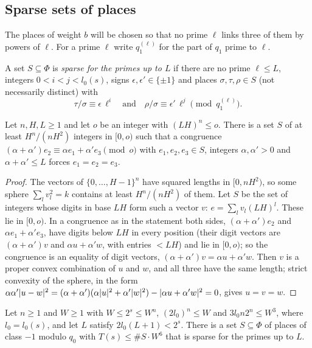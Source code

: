 \subsection{Sparse sets of places}\label{ss:sparse}
The places of weight $b$ will be chosen so that no prime $\ell$ links three of them by powers of
$\ell$. For a prime $\ell$ write $q_1^{(\ell)}$ for the part of $q_1$ prime to $\ell$.

\begin{definition}\label{def:sparse}
A set $S\subseteq\Phi$ is \emph{sparse for the primes up to $L$} if there are no prime $\ell\le L$,
integers $0<i<j<l_0(s)$, signs $\epsilon,\epsilon'\in\{\pm1\}$ and places $\sigma,\tau,\rho\in S$
(not necessarily distinct) with
\[
  \tau/\sigma\equiv\epsilon\,\ell^i\quad\text{and}\quad\rho/\sigma\equiv\epsilon'\,\ell^j
  \pmod{q_1^{(\ell)}}.
\]
\end{definition}

\begin{lemma}\label{lem:behrend}
Let $n,H,L\ge1$ and let $o$ be an integer with $(LH)^n\le o$. There is a set $S$ of at least
$H^n/(nH^2)$ integers in $[0,o)$ such that a congruence
$(\alpha+\alpha')e_2\equiv\alpha e_1+\alpha'e_3\pmod o$ with $e_1,e_2,e_3\in S$, integers
$\alpha,\alpha'>0$ and $\alpha+\alpha'\le L$ forces $e_1=e_2=e_3$.
\end{lemma}

\begin{proof}
The vectors of $\{0,\dots,H-1\}^n$ have squared lengths in $[0,nH^2)$, so some sphere
$\sum_lv_l^2=k$ contains at least $H^n/(nH^2)$ of them. Let $S$ be the set of integers whose digits in
base $LH$ form such a vector $v$: $e=\sum_lv_l(LH)^l$. These lie in $[0,o)$. In a congruence as in the
statement both sides, $(\alpha+\alpha')e_2$ and $\alpha e_1+\alpha'e_3$, have digits below $LH$ in
every position (their digit vectors are $(\alpha+\alpha')v$ and $\alpha u+\alpha'w$, with entries
$<LH$) and lie in $[0,o)$; so the congruence is an equality of digit vectors,
$(\alpha+\alpha')v=\alpha u+\alpha'w$. Then $v$ is a proper convex combination of $u$ and $w$, and
all three have the same length; strict convexity of the sphere, in the form
$\alpha\alpha'\lvert u-w\rvert^2=(\alpha+\alpha')(\alpha\lvert u\rvert^2+\alpha'\lvert w\rvert^2)-\lvert \alpha u+\alpha'w\rvert^2=0$,
gives $u=v=w$.
\end{proof}

\begin{proposition}\label{prop:sparse}
Let $n\ge1$ and $W\ge1$ with $W\le2^s\le W^n$, $(2l_0)^n\le W$ and $3l_0n2^n\le W^3$, where
$l_0=l_0(s)$, and let $L$ satisfy $2l_0(L+1)<2^s$. There is a set $S\subseteq\Phi$ of places of
class $-1$ modulo $q_0$ with $T(s)\le\#S\cdot W^6$ that is sparse for the primes up to $L$.
\end{proposition}

